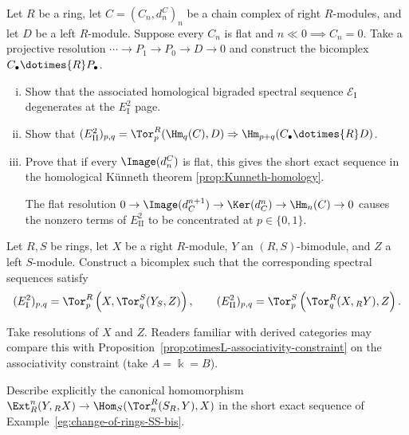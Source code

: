 \begin{Exercises}
	\item Let $R$ be a ring, let $C=(C_n,d^C_n)_n$ be a chain complex of right
	$R$-modules, and let $D$ be a left $R$-module. Suppose every $C_n$ is flat
	and $n\ll0\implies C_n=0$. Take a projective resolution
	$\cdots\to P_1\to P_0\to D\to0$ and construct the bicomplex
	$C_\bullet\dotimes{R}P_\bullet$.
	\begin{enumerate}[(i)]
		\item Show that the associated homological bigraded spectral sequence
		$\mathscr{E}_{\mathrm{I}}$ degenerates at the
		$E_{\mathrm{I}}^2$ page.
		\item Show that
		$(E_{\mathrm{II}}^2)_{p,q}=\Tor^R_p(\Hm_q(C),D)
		\Rightarrow\Hm_{p+q}(C_\bullet\dotimes{R}D)$.
		\item Prove that if every $\Image(d^C_n)$ is flat, this gives the short
		exact sequence in the homological K\"unneth theorem
		\ref{prop:Kunneth-homology}.
		\begin{hint}
			The flat resolution
			$0\to\Image(d_C^{n+1})\to\Ker(d_C^n)\to\Hm_n(C)\to0$
			causes the nonzero terms of $E_{\mathrm{II}}^2$ to be concentrated
			at $p\in\{0,1\}$.
		\end{hint}
	\end{enumerate}

	\item Let $R,S$ be rings, let $X$ be a right $R$-module, $Y$ an
	$(R,S)$-bimodule, and $Z$ a left $S$-module. Construct a bicomplex such
	that the corresponding spectral sequences satisfy
	\[ (E_{\mathrm{I}}^2)_{p,q}
	=\Tor^R_p\left(X,\Tor^S_q(Y_S,Z)\right),\qquad
	(E_{\mathrm{II}}^2)_{p,q}
	=\Tor^S_p\left(\Tor^R_q(X,{}_RY),Z\right). \]
	\begin{hint}
		Take resolutions of $X$ and $Z$. Readers familiar with derived
		categories may compare this with
		Proposition~\ref{prop:otimesL-associativity-constraint} on the
		associativity constraint (take $A=\Bbbk=B$).
	\end{hint}

	\item Describe explicitly the canonical homomorphism
	$\Ext^n_R(Y,{}_RX)\to\Hom_S(\Tor^R_n(S_R,Y),X)$ in the short exact
	sequence of Example~\ref{eg:change-of-rings-SS-bis}.
\end{Exercises}

